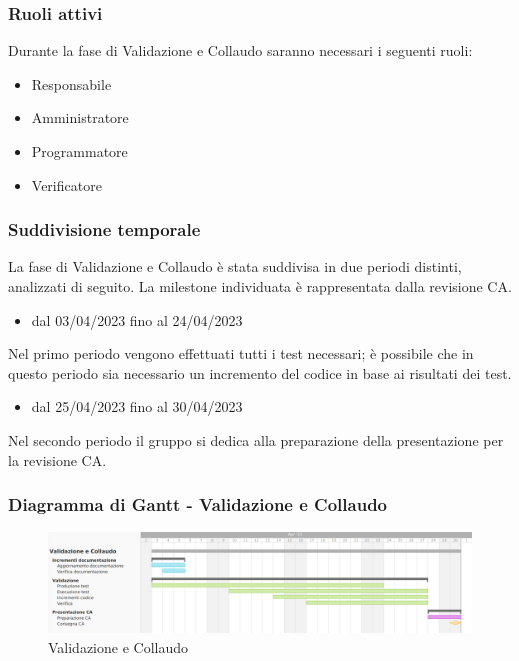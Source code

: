 \subsubsection{Ruoli attivi}
Durante la fase di Validazione e Collaudo saranno necessari i seguenti ruoli:
\begin{itemize}
	\item Responsabile
    \item Amministratore
    \item Programmatore
    \item Verificatore
\end{itemize}

\subsubsection{Suddivisione temporale}
La fase di Validazione e Collaudo è stata suddivisa in due periodi distinti, analizzati di seguito. La milestone individuata è rappresentata dalla revisione CA.

\begin{itemize}
    \item dal 03/04/2023 fino al 24/04/2023
\end{itemize}
Nel primo periodo vengono effettuati tutti i test necessari; è possibile che in questo periodo sia necessario un incremento del codice in base ai risultati dei test.

\begin{itemize}
    \item dal 25/04/2023 fino al 30/04/2023
\end{itemize}
Nel secondo periodo il gruppo si dedica alla preparazione della presentazione per la revisione CA.

\subsubsection{Diagramma di Gantt - Validazione e Collaudo}

\begin{figure}[H]
\centering
\includegraphics[width=\textwidth]{img/4_collaudo.png}
\caption{Validazione e Collaudo}
\end{figure}

